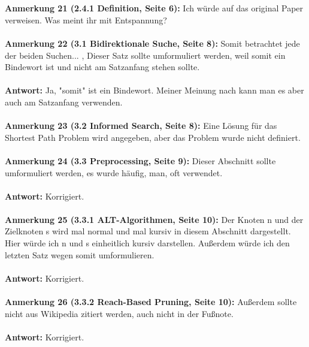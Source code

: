\documentclass[a4paper,12pt]{book}
\begin{document}
\\ \\
\textbf{Anmerkung 21 (2.4.1 Definition, Seite 6):}
Ich würde auf das original Paper verweisen. 
Was meint ihr mit Entspannung?
\\ \\
\textbf{Anmerkung 22 (3.1 Bidirektionale Suche, Seite 8):}
\grqq Somit betrachtet jede der beiden Suchen... \glqq{}, Dieser Satz sollte umformuliert werden, weil somit ein Bindewort ist und nicht am Satzanfang stehen sollte. 
\\ \\
\textbf{Antwort:}
Ja, "somit" ist ein Bindewort. Meiner Meinung nach kann man es aber auch am Satzanfang verwenden.
\\ \\
\textbf{Anmerkung 23 (3.2 Informed Search, Seite 8):}
Eine Lösung für das Shortest Path Problem wird angegeben, aber das Problem wurde nicht definiert.
\\ \\
\textbf{Anmerkung 24 (3.3 Preprocessing, Seite 9):} 
Dieser Abschnitt sollte umformuliert werden, es wurde \glqq häufig, man, oft\grqq{} verwendet. 
\\ \\
\textbf{Antwort:}
Korrigiert. 
\\ \\
\textbf{Anmerkung 25 (3.3.1 ALT-Algorithmen, Seite 10):}
Der Knoten n und der Zielknoten s wird mal normal und mal kursiv in diesem Abschnitt dargestellt. Hier würde ich n und s einheitlich kursiv darstellen. Außerdem würde ich den letzten Satz wegen \glqq somit\grqq{} umformulieren.
\\ \\
\textbf{Antwort:}
Korrigiert.
\\ \\
\textbf{Anmerkung 26 (3.3.2 Reach-Based Pruning, Seite 10):}
Außerdem sollte nicht aus Wikipedia zitiert werden, auch nicht in der Fußnote.
\\ \\
\textbf{Antwort:}
Korrigiert.
\end{document}
